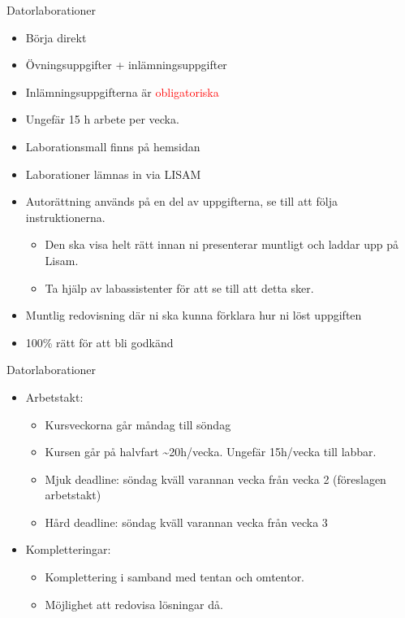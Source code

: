 \documentclass[
  10pt,
  ignorenonframetext,
]{beamer}
\providecommand{\tightlist}{%
  \setlength{\itemsep}{0pt}\setlength{\parskip}{0pt}}
\begin{document}
\begin{frame}{Datorlaborationer}
\protect\hypertarget{datorlaborationer}{}
\begin{itemize}
\tightlist
\item
  Börja direkt
\item
  Övningsuppgifter + inlämningsuppgifter
\item
  Inlämningsuppgifterna är \textcolor{red}{obligatoriska} 
\item
  Ungefär 15 h arbete per vecka.
\item
  Laborationsmall finns på hemsidan
\item
  Laborationer lämnas in via LISAM
\item
  Autorättning används på en del av uppgifterna, se till att följa
  instruktionerna.

  \begin{itemize}
  \tightlist
  \item
    Den ska visa helt rätt innan ni presenterar muntligt och laddar upp
    på Lisam.
  \item
    Ta hjälp av labassistenter för att se till att detta sker.
  \end{itemize}
\item
  Muntlig redovisning där ni ska kunna förklara hur ni löst uppgiften
\item
  100\% rätt för att bli godkänd
\end{itemize}
\end{frame}

\begin{frame}{Datorlaborationer}
\protect\hypertarget{datorlaborationer-1}{}
\begin{itemize}
\tightlist
\item
  Arbetstakt:

  \begin{itemize}
  \tightlist
  \item
    Kursveckorna går måndag till söndag
  \item
    Kursen går på halvfart \textasciitilde20h/vecka. Ungefär 15h/vecka
    till labbar.
  \item
    Mjuk deadline: söndag kväll varannan vecka från vecka 2 (föreslagen arbetstakt)
  \item
    Hård deadline: söndag kväll varannan vecka från vecka 3
  \end{itemize}
\item
  Kompletteringar:

  \begin{itemize}
  \tightlist
  \item
    Komplettering i samband med tentan och omtentor.
  \item
    Möjlighet att redovisa lösningar då.
  \end{itemize}
\end{itemize}
\end{frame}
\end{document}
